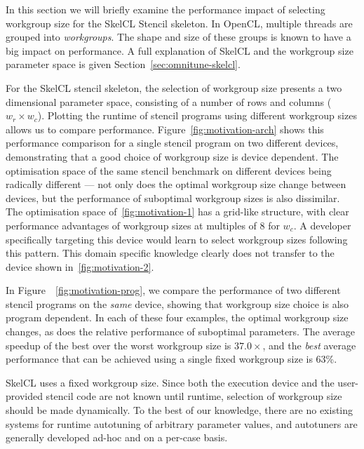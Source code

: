 \documentclass[nonatbib,preprint,9pt]{sigplanconf}
\begin{document}
In this section we will briefly examine the performance impact of
selecting workgroup size for the SkelCL Stencil skeleton. In OpenCL,
multiple threads are grouped into \emph{workgroups}. The shape and
size of these groups is known to have a big impact on performance. A
full explanation of SkelCL and the workgroup size parameter space is
given Section~\ref{sec:omnitune-skelcl}.

For the SkelCL stencil skeleton, the selection of workgroup size
presents a two dimensional parameter space, consisting of a number of
rows and columns ($w_r \times w_c$).  Plotting the runtime of stencil
programs using different workgroup sizes allows us to compare
performance. Figure~\ref{fig:motivation-arch} shows this performance
comparison for a single stencil program on two different devices,
demonstrating that a good choice of workgroup size is device
dependent. The optimisation space of the same stencil benchmark on
different devices being radically different --- not only does the
optimal workgroup size change between devices, but the performance of
suboptimal workgroup sizes is also dissimilar. The optimisation space
of~\ref{fig:motivation-1} has a grid-like structure, with clear
performance advantages of workgroup sizes at multiples of 8 for
$w_c$. A developer specifically targeting this device would learn to
select workgroup sizes following this pattern. This domain specific
knowledge clearly does not transfer to the device shown
in~\ref{fig:motivation-2}.

In Figure~~\ref{fig:motivation-prog}, we compare the performance of
two different stencil programs on the \emph{same} device, showing that
workgroup size choice is also program dependent. In each of these four
examples, the optimal workgroup size changes, as does the relative
performance of suboptimal parameters. The average speedup of the best
over the worst workgroup size is $37.0\times$, and the \emph{best}
average performance that can be achieved using a single fixed
workgroup size is 63\%.

SkelCL uses a fixed workgroup size. Since both the execution device
and the user-provided stencil code are not known until runtime,
selection of workgroup size should be made dynamically. To the best of
our knowledge, there are no existing systems for runtime autotuning of
arbitrary parameter values, and autotuners are generally developed
ad-hoc and on a per-case basis.


\end{document}
